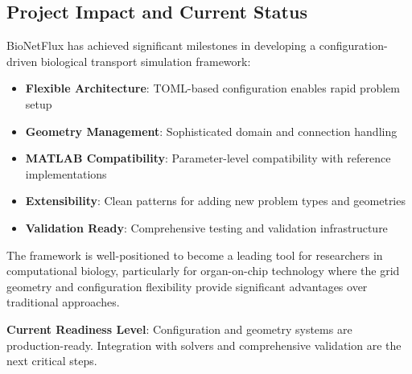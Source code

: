 \subsection{Project Impact and Current Status}

BioNetFlux has achieved significant milestones in developing a configuration-driven biological transport simulation framework:

\begin{itemize}
    \item \textbf{Flexible Architecture}: TOML-based configuration enables rapid problem setup
    \item \textbf{Geometry Management}: Sophisticated domain and connection handling
    \item \textbf{MATLAB Compatibility}: Parameter-level compatibility with reference implementations
    \item \textbf{Extensibility}: Clean patterns for adding new problem types and geometries
    \item \textbf{Validation Ready}: Comprehensive testing and validation infrastructure
\end{itemize}

The framework is well-positioned to become a leading tool for researchers in computational biology, particularly for organ-on-chip technology where the grid geometry and configuration flexibility provide significant advantages over traditional approaches.

\textbf{Current Readiness Level}: Configuration and geometry systems are production-ready. Integration with solvers and comprehensive validation are the next critical steps.

